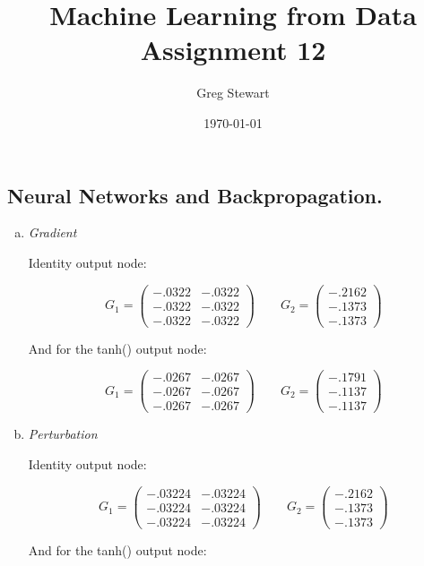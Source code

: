 \documentclass{article}
\title{Machine Learning from Data Assignment 12}
\author{Greg Stewart}
\date{\today}
\begin{document}
\maketitle

\subsection*{Neural Networks and Backpropagation.}

\begin{enumerate}[(a)]
  \item \textit{Gradient}

    Identity output node:

    $$G_1 = \begin{pmatrix} -.0322 & -.0322 \\ -.0322 & -.0322 \\ -.0322 & -.0322 \end{pmatrix}
      \qquad
      G_2 = \begin{pmatrix} -.2162 \\ -.1373 \\ -.1373 \end{pmatrix}$$

    And for the tanh() output node:

    $$G_1 = \begin{pmatrix} -.0267 & -.0267 \\ -.0267 & -.0267 \\ -.0267 & -.0267 \end{pmatrix}
      \qquad
      G_2 = \begin{pmatrix} -.1791 \\ -.1137 \\ -.1137 \end{pmatrix}$$

  \item \textit{Perturbation}

    Identity output node:

    $$G_1 = \begin{pmatrix} -.03224 & -.03224 \\ -.03224 & -.03224 \\ -.03224 & -.03224 \end{pmatrix}
      \qquad
      G_2 = \begin{pmatrix} -.2162 \\ -.1373 \\ -.1373 \end{pmatrix}$$

    And for the tanh() output node:


\end{enumerate}
\end{document}
